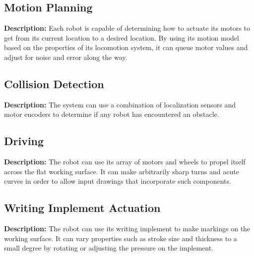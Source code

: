 \subsection{Motion Planning}
\textbf{Description:} Each robot is capable of determining how to actuate its motors to get from its current location to a desired location. By using its motion model based on the properties of its locomotion system, it can queue motor values and adjust for noise and error along the way.

\subsection{Collision Detection}
\textbf{Description:} The system can use a combination of localization sensors and motor encoders to determine if any robot has encountered an obstacle. 

\subsection{Driving}
\textbf{Description:} The robot can use its array of motors and wheels to propel itself across the flat working surface. It can make arbitrarily sharp turns and acute curves in order to allow input drawings that incorporate such components. 

\subsection{Writing Implement Actuation}
\textbf{Description:} The robot can use its writing implement to make markings on the working surface. It can vary properties such as stroke size and thickness to a small degree by rotating or adjusting the pressure on the implement.

